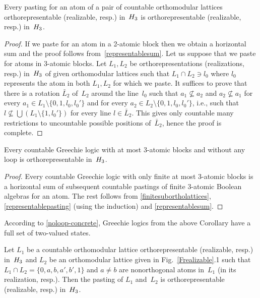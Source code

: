 \begin {proposition} \label{representablepasting}
Every pasting for an atom of a pair of countable orthomodular lattices
orthorepresentable (realizable, resp.) in~$H_3$ is orthorepresentable
(realizable, resp.) in~$H_3$.
\end {proposition}


\begin {proof}
If we paste for an atom in a 2-atomic block then we obtain a horizontal sum
and the proof follows from~\ref{representablesum}. Let us suppose that we
paste for atoms in 3-atomic blocks. Let $L_1,L_2$ be orthorepresentations
(realizations, resp.) in~$H_3$ of given orthomodular lattices such that $L_1
\cap L_2 \ni l_0$ where $l_0$ represents the atom in both $L_1,L_2$ for
which we paste. It suffices to prove that there is a rotation $\bar L_2$
of~$L_2$ around the line~$l_0$ such that $a_1 \not\subseteq a_2$ and $a_2
\not\subseteq a_1$ for every $a_1 \in L_1 \setminus \{0,1,l_0,l_0'\}$ and
for every $a_2 \in L_2 \setminus \{0,1,l_0,l_0'\}$, i.e., such that $l
\not\subseteq \bigcup (L_1 \setminus \{1,l_0'\})$ for every line $l \in \bar
L_2$. This gives only countable many restrictions to uncountable possible
positions of~$\bar L_2$, hence the proof is complete.
\end {proof}


\begin {corollary}
Every countable Greechie logic with at most 3-atomic blocks and without
any loop is orthorepresentable in~$H_3$.
\end {corollary}


\begin {proof}
Every countable Greechie logic with only finite at most 3-atomic blocks is a
horizontal sum of subsequent countable pastings of finite 3-atomic Boolean
algebras for an atom. The rest follows from \ref{finitesubortholattices},
\ref{representablepasting} (using the induction) and \ref{representablesum}.
\end {proof}


According to \ref{noloop-concrete}, Greechie logics from the above Corollary
have a full set of two-valued states.


\begin {lemma} \label{representablepasting2}
Let $L_1$ be a countable orthomodular lattice orthorepresentable
(realizable, resp.) in~$H_3$ and $L_2$ be an orthomodular lattice given in
Fig.~\ref{Frealizable}.1 such that $L_1 \cap L_2 = \{0,a,b,a',b',1\}$ and $a
\neq b$ are nonorthogonal atoms in~$L_1$ (in its realization, resp.). Then
the pasting of $L_1$ and~$L_2$ is orthorepresentable (realizable, resp.)
in~$H_3$.
\end {lemma}


